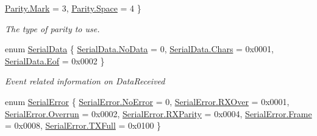 \begin{DoxyCompactItemize}
\mbox{\hyperlink{namespace_r_j_c_p_1_1_i_o_1_1_ports_a35c8c760a80dd0392e605dd3ad169954ab82a9a13f4651e9abcbde90cd24ce2cb}{Parity.\+Mark}} = 3, 
\newline
\mbox{\hyperlink{namespace_r_j_c_p_1_1_i_o_1_1_ports_a35c8c760a80dd0392e605dd3ad169954ad511f8439ecde36647437fbba67a4394}{Parity.\+Space}} = 4
 \}
\begin{DoxyCompactList}\small\item\em The type of parity to use. \end{DoxyCompactList}\item 
enum \mbox{\hyperlink{namespace_r_j_c_p_1_1_i_o_1_1_ports_a2a76844574a0724e6b7755e2f6ec3681}{Serial\+Data}} \{ \mbox{\hyperlink{namespace_r_j_c_p_1_1_i_o_1_1_ports_a2a76844574a0724e6b7755e2f6ec3681acbf169aecd4365561eb6b245659f55d8}{Serial\+Data.\+No\+Data}} = 0, 
\mbox{\hyperlink{namespace_r_j_c_p_1_1_i_o_1_1_ports_a2a76844574a0724e6b7755e2f6ec3681a1d2deb7774be5c79235080ec92e12c98}{Serial\+Data.\+Chars}} = 0x0001, 
\mbox{\hyperlink{namespace_r_j_c_p_1_1_i_o_1_1_ports_a2a76844574a0724e6b7755e2f6ec3681a49650dcc55dc413da4032cbe44b15d37}{Serial\+Data.\+Eof}} = 0x0002
 \}
\begin{DoxyCompactList}\small\item\em Event related information on Data\+Received \end{DoxyCompactList}\item 
enum \mbox{\hyperlink{namespace_r_j_c_p_1_1_i_o_1_1_ports_a117eef0f83d73b56ed3f13d084902e98}{Serial\+Error}} \{ \newline
\mbox{\hyperlink{namespace_r_j_c_p_1_1_i_o_1_1_ports_a117eef0f83d73b56ed3f13d084902e98a70a47cae4eb221930f2663fd244369ea}{Serial\+Error.\+No\+Error}} = 0, 
\mbox{\hyperlink{namespace_r_j_c_p_1_1_i_o_1_1_ports_a117eef0f83d73b56ed3f13d084902e98a062810f39026589e92122604ee543a83}{Serial\+Error.\+R\+X\+Over}} = 0x0001, 
\mbox{\hyperlink{namespace_r_j_c_p_1_1_i_o_1_1_ports_a117eef0f83d73b56ed3f13d084902e98a9fa996dc830f67a458e46cf1463d5cd3}{Serial\+Error.\+Overrun}} = 0x0002, 
\mbox{\hyperlink{namespace_r_j_c_p_1_1_i_o_1_1_ports_a117eef0f83d73b56ed3f13d084902e98a3a3e6bce3957a809a705fe9f757a81ba}{Serial\+Error.\+R\+X\+Parity}} = 0x0004, 
\newline
\mbox{\hyperlink{namespace_r_j_c_p_1_1_i_o_1_1_ports_a117eef0f83d73b56ed3f13d084902e98a3bb3e8c8a24891ba0f7608bcc96f8b0a}{Serial\+Error.\+Frame}} = 0x0008, 
\mbox{\hyperlink{namespace_r_j_c_p_1_1_i_o_1_1_ports_a117eef0f83d73b56ed3f13d084902e98a97379078d4b231a1750c7a97217aaf3f}{Serial\+Error.\+T\+X\+Full}} = 0x0100
 \}

\end{DoxyCompactItemize}

